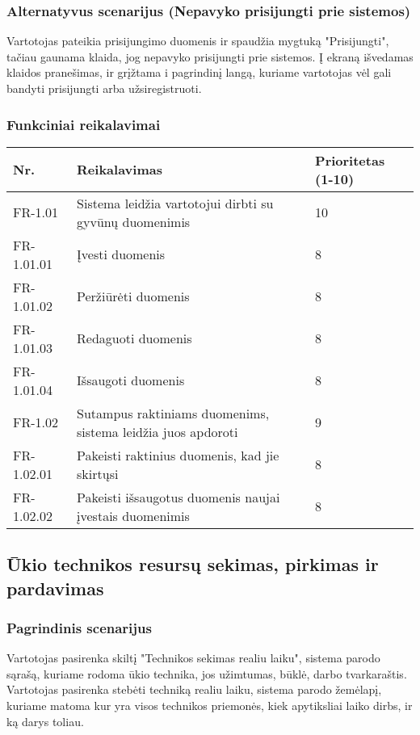 \documentclass[oneside]{VUMIFPSkursinis}
\begin{document}
\subsubsection{Alternatyvus scenarijus (Nepavyko prisijungti prie sistemos)}
	Vartotojas pateikia prisijungimo duomenis ir spaudžia mygtuką "Prisijungti", tačiau gaunama klaida, jog nepavyko prisijungti prie sistemos. Į ekraną išvedamas klaidos pranešimas, ir grįžtama i pagrindinį langą, kuriame vartotojas vėl gali bandyti prisijungti arba užsiregistruoti.
\subsubsection{Funkciniai reikalavimai}
\begin{table}[htbp]
	\begin{tabularx}{1\textwidth}{ |P{2.5cm}|X|P{3cm }| } \hline
           	Nr. & Reikalavimas &  Prioritetas (1-10)  \\   \hline 
         	FR-1.01 & Sistema leidžia vartotojui dirbti su gyvūnų duomenimis & 10  \\   \hline
		FR-1.01.01 & Įvesti duomenis & 8 \\ \hline
		FR-1.01.02 & Peržiūrėti duomenis & 8 \\ \hline
		FR-1.01.03 & Redaguoti duomenis & 8 \\ \hline
		FR-1.01.04 & Išsaugoti duomenis & 8 \\ \hline
        	FR-1.02 & Sutampus raktiniams duomenims, sistema leidžia juos apdoroti & 9   \\   \hline
		FR-1.02.01 & Pakeisti raktinius duomenis, kad jie skirtųsi & 8 \\ \hline
		FR-1.02.02 & Pakeisti išsaugotus duomenis naujai įvestais duomenimis & 8 \\ \hline
	\end{tabularx}
\end{table}

\subsection{Ūkio technikos resursų sekimas, pirkimas ir pardavimas}
\subsubsection{Pagrindinis scenarijus}
	Vartotojas pasirenka skiltį "Technikos sekimas realiu laiku", sistema parodo sąrašą, kuriame rodoma ūkio technika, jos užimtumas, būklė, darbo tvarkaraštis. Vartotojas pasirenka stebėti techniką realiu laiku, sistema parodo žemėlapį, kuriame matoma kur yra visos technikos priemonės, kiek apytiksliai laiko dirbs, ir ką darys toliau.
\end{document}
